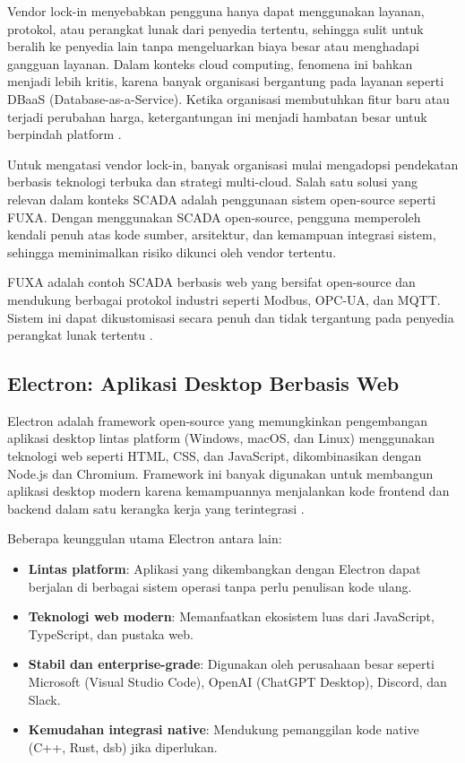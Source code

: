 Vendor lock-in menyebabkan pengguna hanya dapat menggunakan layanan, protokol, atau perangkat lunak dari penyedia tertentu, sehingga sulit untuk beralih ke penyedia lain tanpa mengeluarkan biaya besar atau menghadapi gangguan layanan. Dalam konteks cloud computing, fenomena ini bahkan menjadi lebih kritis, karena banyak organisasi bergantung pada layanan seperti DBaaS (Database-as-a-Service). Ketika organisasi membutuhkan fitur baru atau terjadi perubahan harga, ketergantungan ini menjadi hambatan besar untuk berpindah platform \parencite{banthia2024vendorlockin}.

Untuk mengatasi vendor lock-in, banyak organisasi mulai mengadopsi pendekatan berbasis teknologi terbuka dan strategi multi-cloud. Salah satu solusi yang relevan dalam konteks SCADA adalah penggunaan sistem open-source seperti FUXA. Dengan menggunakan SCADA open-source, pengguna memperoleh kendali penuh atas kode sumber, arsitektur, dan kemampuan integrasi sistem, sehingga meminimalkan risiko dikunci oleh vendor tertentu.

FUXA adalah contoh SCADA berbasis web yang bersifat open-source dan mendukung berbagai protokol industri seperti Modbus, OPC-UA, dan MQTT. Sistem ini dapat dikustomisasi secara penuh dan tidak tergantung pada penyedia perangkat lunak tertentu \parencite{seeed2024fuxa}.

\subsection{Electron: Aplikasi Desktop Berbasis Web}
Electron adalah framework open-source yang memungkinkan pengembangan aplikasi desktop lintas platform (Windows, macOS, dan Linux) menggunakan teknologi web seperti HTML, CSS, dan JavaScript, dikombinasikan dengan Node.js dan Chromium. Framework ini banyak digunakan untuk membangun aplikasi desktop modern karena kemampuannya menjalankan kode frontend dan backend dalam satu kerangka kerja yang terintegrasi \parencite{electron2024why}.

Beberapa keunggulan utama Electron antara lain:

\begin{itemize}
\item \textbf{Lintas platform}: Aplikasi yang dikembangkan dengan Electron dapat berjalan di berbagai sistem operasi tanpa perlu penulisan kode ulang.
\item \textbf{Teknologi web modern}: Memanfaatkan ekosistem luas dari JavaScript, TypeScript, dan pustaka web.
\item \textbf{Stabil dan enterprise-grade}: Digunakan oleh perusahaan besar seperti Microsoft (Visual Studio Code), OpenAI (ChatGPT Desktop), Discord, dan Slack.
\item \textbf{Kemudahan integrasi native}: Mendukung pemanggilan kode native (C++, Rust, dsb) jika diperlukan.
\end{itemize}

